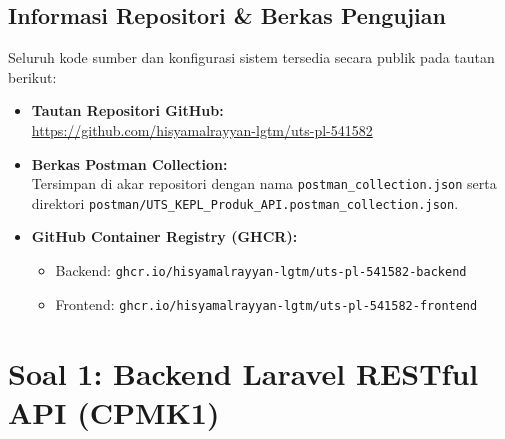 \documentclass[a4paper,oneside,11pt]{book}
\begin{document}
\section{Informasi Repositori \& Berkas Pengujian}
Seluruh kode sumber dan konfigurasi sistem tersedia secara publik pada tautan berikut:
\begin{itemize}
    \item \textbf{Tautan Repositori GitHub:} \\ \url{https://github.com/hisyamalrayyan-lgtm/uts-pl-541582}
    \item \textbf{Berkas Postman Collection:} \\ Tersimpan di akar repositori dengan nama \texttt{postman\_collection.json} serta direktori \texttt{postman/UTS\_KEPL\_Produk\_API.postman\_collection.json}.
    \item \textbf{GitHub Container Registry (GHCR):}
    \begin{itemize}
        \item Backend: \texttt{ghcr.io/hisyamalrayyan-lgtm/uts-pl-541582-backend}
        \item Frontend: \texttt{ghcr.io/hisyamalrayyan-lgtm/uts-pl-541582-frontend}
    \end{itemize}
\end{itemize}

\chapter{Soal 1: Backend Laravel RESTful API (CPMK1)}
\end{document}

